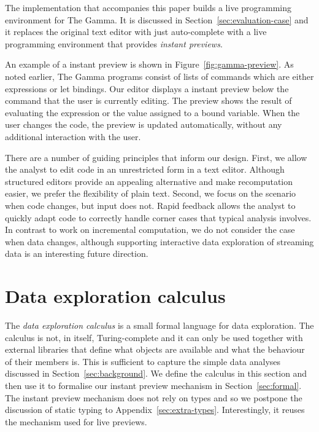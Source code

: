 \documentclass[english,crc]{programming}
\theoremstyle{plain}
\theoremstyle{definition}
\begin{document}
The implementation that accompanies this paper builds a live programming environment for The Gamma.
It is discussed in Section~\ref{sec:evaluation-case} and it replaces
the original text editor with just auto-complete with a live programming environment
that provides \emph{instant previews}.

An example of a instant preview is shown in Figure~\ref{fig:gamma-preview}. As noted earlier, The
Gamma programs consist of lists of commands which are either expressions or let bindings. Our
editor displays a instant preview below the command that the user is currently editing. The preview
shows the result of evaluating the expression or the value assigned to a bound variable. When the
user changes the code, the preview is updated automatically, without any additional interaction
with the user.

There are a number of guiding principles that inform our design. First, we allow the analyst
to edit code in an unrestricted form in a text editor. Although structured editors provide an
appealing alternative and make recomputation easier, we prefer the flexibility of plain text.
Second, we focus on the scenario when code changes, but input
does not. Rapid feedback allows the analyst to quickly adapt code to correctly handle
corner cases that typical analysis involves. In contrast to work on incremental computation,
we do not consider the case when data changes, although supporting interactive data exploration
of streaming data is an interesting future direction.


\section{Data exploration calculus}
\label{sec:calculus}

The \emph{data exploration calculus} is a small formal language for data exploration. The calculus
is not, in itself, Turing-complete and it can only be used together with external libraries that
define what objects are available and what the behaviour of their members is. This is
sufficient to capture the simple data analyses discussed in Section~\ref{sec:background}. We
define the calculus in this section and then use it to formalise our instant preview
mechanism in Section~\ref{sec:formal}.
%
The instant preview mechanism does not rely on types and so we postpone the discussion of static
typing to Appendix~\ref{sec:extra-types}. Interestingly, it reuses the mechanism used for live
previews.
\end{document}
